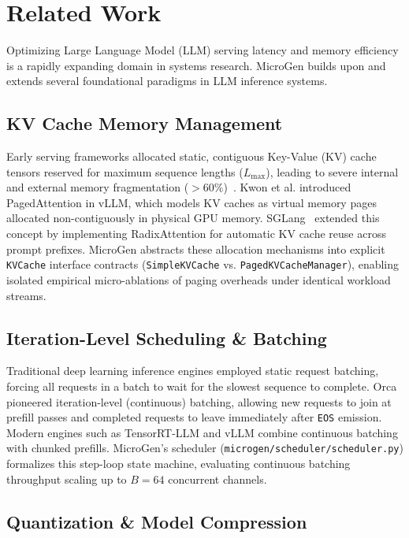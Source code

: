\section{Related Work}
\label{sec:related_work}

Optimizing Large Language Model (LLM) serving latency and memory efficiency is a rapidly expanding domain in systems research. \textsf{MicroGen} builds upon and extends several foundational paradigms in LLM inference systems.

\subsection{KV Cache Memory Management}
\label{sec:rel_memory}

Early serving frameworks allocated static, contiguous Key-Value (KV) cache tensors reserved for maximum sequence lengths ($L_{\text{max}}$), leading to severe internal and external memory fragmentation ($>60\%$)~\cite{kwon2023pagedattention}. Kwon et al. introduced PagedAttention in vLLM, which models KV caches as virtual memory pages allocated non-contiguously in physical GPU memory. SGLang~\cite{zheng2024sglang} extended this concept by implementing RadixAttention for automatic KV cache reuse across prompt prefixes. \textsf{MicroGen} abstracts these allocation mechanisms into explicit \texttt{KVCache} interface contracts (\texttt{SimpleKVCache} vs. \texttt{PagedKVCacheManager}), enabling isolated empirical micro-ablations of paging overheads under identical workload streams.

\subsection{Iteration-Level Scheduling \& Batching}
\label{sec:rel_scheduling}

Traditional deep learning inference engines employed static request batching, forcing all requests in a batch to wait for the slowest sequence to complete. Orca~\cite{yu2022orca} pioneered iteration-level (continuous) batching, allowing new requests to join at prefill passes and completed requests to leave immediately after \texttt{EOS} emission. Modern engines such as TensorRT-LLM and vLLM combine continuous batching with chunked prefills. \textsf{MicroGen}'s scheduler (\texttt{microgen/scheduler/scheduler.py}) formalizes this step-loop state machine, evaluating continuous batching throughput scaling up to $B=64$ concurrent channels.

\subsection{Quantization \& Model Compression}
\label{sec:rel_quant}

